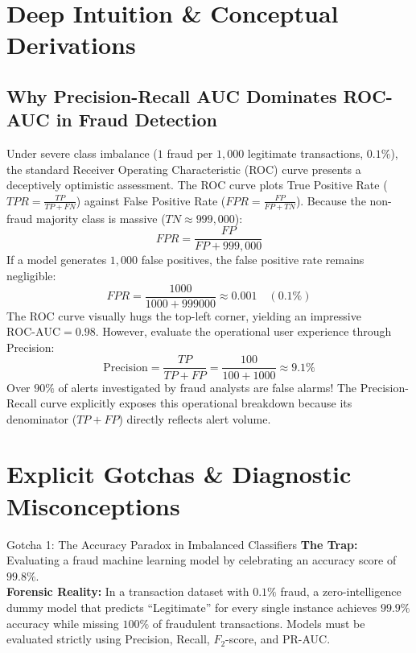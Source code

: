 \section{Deep Intuition \& Conceptual Derivations}

\subsection{Why Precision-Recall AUC Dominates ROC-AUC in Fraud Detection}
Under severe class imbalance ($1$ fraud per $1{,}000$ legitimate transactions, $0.1\%$), the standard Receiver Operating Characteristic (ROC) curve presents a deceptively optimistic assessment. 
The ROC curve plots True Positive Rate ($TPR = \frac{TP}{TP+FN}$) against False Positive Rate ($FPR = \frac{FP}{FP+TN}$). 
Because the non-fraud majority class is massive ($TN \approx 999{,}000$):
\begin{equation}
FPR = \frac{FP}{FP + 999{,}000}
\end{equation}
If a model generates $1{,}000$ false positives, the false positive rate remains negligible:
\begin{equation}
FPR = \frac{1000}{1000 + 999000} \approx 0.001 \quad (0.1\%)
\end{equation}
The ROC curve visually hugs the top-left corner, yielding an impressive $\text{ROC-AUC} = 0.98$.
However, evaluate the operational user experience through Precision:
\begin{equation}
\text{Precision} = \frac{TP}{TP + FP} = \frac{100}{100 + 1000} \approx 9.1\%
\end{equation}
Over $90\%$ of alerts investigated by fraud analysts are false alarms! The Precision-Recall curve explicitly exposes this operational breakdown because its denominator ($TP + FP$) directly reflects alert volume.

\section{Explicit Gotchas \& Diagnostic Misconceptions}

\begin{trapbox}{Gotcha 1: The Accuracy Paradox in Imbalanced Classifiers}
\textbf{The Trap:} Evaluating a fraud machine learning model by celebrating an accuracy score of $99.8\%$.\\
\textbf{Forensic Reality:} In a transaction dataset with $0.1\%$ fraud, a zero-intelligence dummy model that predicts ``Legitimate'' for every single instance achieves $99.9\%$ accuracy while missing $100\%$ of fraudulent transactions. Models must be evaluated strictly using Precision, Recall, $F_2$-score, and PR-AUC.
\end{trapbox}

